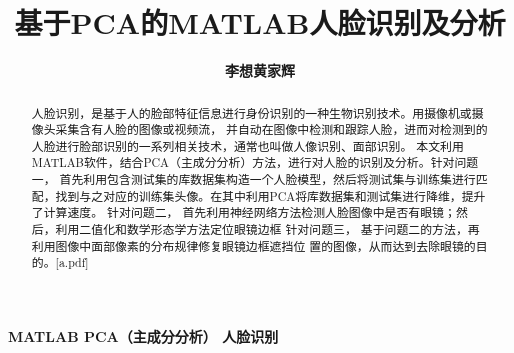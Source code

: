 \documentclass[12pt]{article}
\title{\textbf{基于PCA的MATLAB人脸识别及分析}}  %
\author{\textbf {李\quad 想\qquad 黄家辉}}  %
\date{} %
\begin{document}
    \maketitle %
     \begin{abstract} 
    \renewcommand{\abstractname}{\large Abstract\\}
    人脸识别，是基于人的脸部特征信息进行身份识别的一种生物识别技术。用摄像机或摄像头采集含有人脸的图像或视频流，
并自动在图像中检测和跟踪人脸，进而对检测到的人脸进行脸部识别的一系列相关技术，通常也叫做人像识别、面部识别。
本文利用MATLAB软件，结合PCA（主成分分析）方法，进行对人脸的识别及分析。针对问题一，
首先利用包含测试集的库数据集构造一个人脸模型，然后将测试集与训练集进行匹配，找到与之对应的训练集头像。在其中利用PCA将库数据集和测试集进行降维，提升了计算速度。
针对问题二，
首先利用神经网络方法检测人脸图像中是否有眼镜；然
后，利用二值化和数学形态学方法定位眼镜边框
针对问题三，
基于问题二的方法，再
利用图像中面部像素的分布规律修复眼镜边框遮挡位
置的图像，从而达到去除眼镜的目的。[a.pdf]\par    

         \end{abstract}

   { \textbf{{\kaishu{}}{\songti{}MATLAB  \quad  PCA（主成分分析） \quad 人脸识别  }}}
\end{document}
